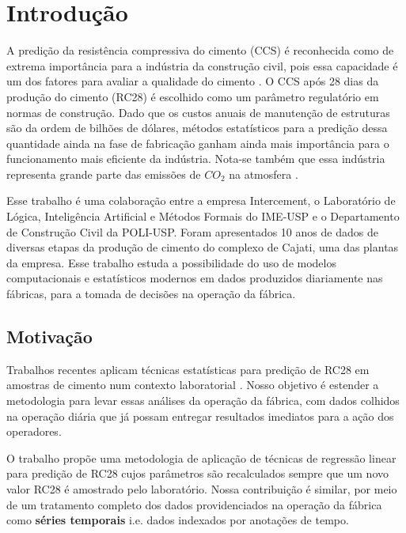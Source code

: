 \chapter{Introdução}
\label{cap:introducao}


A predição da resistência compressiva do cimento (CCS) é reconhecida como de
extrema importância para a indústria da construção civil, pois essa
capacidade é um dos fatores para avaliar a qualidade do cimento
\citep{cementml}. O CCS após 28 dias da produção do cimento (RC28) é escolhido
 como um parâmetro regulatório em normas de construção. Dado que os custos
 anuais de manutenção de estruturas são da ordem de bilhões de dólares, métodos
 estatísticos para a predição dessa quantidade ainda na fase de fabricação ganham ainda mais importância para o
 funcionamento mais eficiente da indústria. Nota-se também que essa  
 indústria representa grande parte das emissões de $CO_2$ na atmosfera \citep{cementroadmap}.

Esse trabalho é uma colaboração entre a empresa Intercement, o Laboratório de
Lógica, Inteligência Artificial e Métodos Formais do IME-USP e o Departamento de
Construção Civil da POLI-USP. Foram apresentados
10 anos de dados de diversas etapas da produção de cimento do complexo de
Cajati, uma das plantas da empresa. Esse trabalho estuda a possibilidade do uso
de modelos computacionais e estatísticos modernos em dados produzidos diariamente nas fábricas,
para a tomada de decisões na operação da fábrica.


\section {Motivação}



Trabalhos recentes aplicam técnicas estatísticas para predição de RC28 em amostras de cimento num
contexto laboratorial \citep{cementlin,nncement}.
Nosso objetivo é estender a metodologia para
levar essas análises da operação da fábrica, com dados colhidos na operação diária que já
possam entregar resultados imediatos para a ação dos operadores.

O trabalho \citep{dynstat} propõe uma metodologia de aplicação de técnicas de
regressão linear  para predição de RC28 cujos parâmetros são recalculados
sempre que um novo valor RC28 é amostrado pelo laboratório. Nossa contribuição é
similar, por meio de um tratamento completo dos dados providenciados na operação da fábrica como
\textbf{séries temporais} i.e. dados indexados por anotações de tempo.

